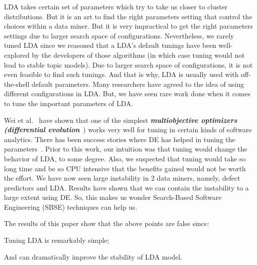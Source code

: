 \documentclass[10pt,conference]{IEEEtran}
\theoremstyle{break}
\begin{document}
LDA takes certain set of parameters which try to take us closer to cluster distributions. But it is an art to find the right parameters setting that control the choices within a data miner. But it is very impractical to get the right parameters settings due to larger search space of configurations. Nevertheless, we rarely tuned LDA since we reasoned that a LDA’s default tunings have been well-explored by the developers of those algorithms (in which case tuning would not lead to stable topic models). Due to larger search space of configurations, it is not even feasible to find such tunings. And that is why, LDA is usually used with off-the-shell default parameters. Many researchers have agreed to the idea of using different configurations in LDA. But, we have seen rare work done when it comes to tune the important parameters of LDA.

Wei et al.~\cite{fu2016tuning} have shown that one of the simplest \textit{\textbf{multiobjective optimizers (differential evolution}}~\cite{storn1997differential}) works very well for tuning in certain kinds of software analytics. There has been success stories where DE has helped in tuning the parameters~\cite{bazi2014differential, chiha2012tuning}. Prior to this work, our intuition was that tuning would change the behavior of LDA, to some degree. Also, we suspected that tuning would take so long time and be so CPU intensive that the benefits gained would not be worth the effort. We have now seen large instability in 2 data miners, namely, defect predictors and LDA. Results have shown that we can contain the instability to a large extent using DE. So, this makes us wonder Search-Based Software Engineering (SBSE) techniques can help us.

The results of this paper show that the above points are false since:
\begin{compactitem}
  \item Tuning LDA is remarkably simple;
  \item And can dramatically improve the stability of LDA model.
\end{compactitem}
\end{document}
